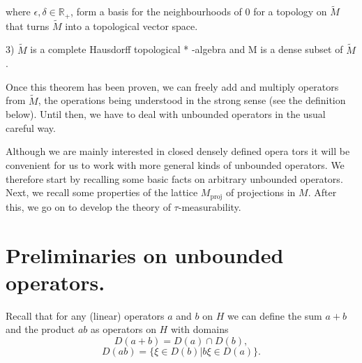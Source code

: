 where $\epsilon,\delta\in \mathbb{R}_+$, form a basis for the neighbourhoods of $0$ for a topology on $\widetilde{M}$ that turns $\widetilde{M}$ into a topological vector space. \par
3) $\widetilde{M}$ is a complete Hausdorff topological * -algebra and M is a dense subset of $\widetilde{M}$.\par
\bigskip
Once this theorem has been proven, we can freely add and multiply operators from $\widetilde{M}$, the operations being understood in the strong sense (see the definition below). Until then, we have to deal with unbounded operators in the usual careful way.\par
Although we are mainly interested in closed densely defined opera tors it will be convenient for us to work with more general kinds of unbounded operators. We therefore start by recalling some basic facts on arbitrary unbounded operators. Next, we recall some properties of the lattice $M_{\text{proj}}$ of projections in $M$. After this, we go on to develop the theory of $\tau$-measurability.\par
\bigskip
\section*{Preliminaries on unbounded operators.}\par
Recall that for any (linear) operators $a$ and $b$ on $H$ we can define the sum $a+b$ and the product $ab$ as operators on $H$ with domains
\begin{equation}
    D(a+b)=D(a)\cap D(b),
\end{equation}
\begin{equation}
    D(ab)=\{\xi\in D(b)|b\xi\in D(a)\}.
\end{equation}
% 